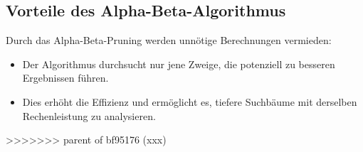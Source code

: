 \subsection*{Vorteile des Alpha-Beta-Algorithmus}

Durch das Alpha-Beta-Pruning werden unnötige Berechnungen vermieden:
\begin{itemize}
	\item Der Algorithmus durchsucht nur jene Zweige, die potenziell zu besseren Ergebnissen führen.
	\item Dies erhöht die Effizienz und ermöglicht es, tiefere Suchbäume mit derselben Rechenleistung zu analysieren.
\end{itemize}
>>>>>>> parent of bf95176 (xxx)
